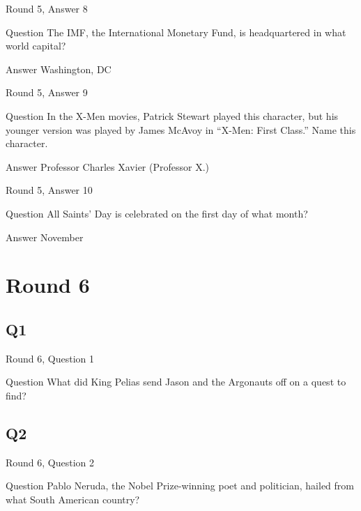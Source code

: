 \documentclass[11pt]{beamer}
\begin{document}
\begin{frame}[t]{Round 5, Answer 8}
\vspace{2em}
\begin{block}{Question}
The IMF, the International Monetary Fund, is headquartered in what world capital\@?
\end{block}
\pause{}
\begin{block}{Answer}
Washington, DC
\end{block}
\end{frame}
    

\begin{frame}[t]{Round 5, Answer 9}
\vspace{2em}
\begin{block}{Question}
In the X-Men movies, Patrick Stewart played this character, but his younger version was played by James McAvoy in ``X-Men: First Class.'' Name this character.
\end{block}
\pause{}
\begin{block}{Answer}
Professor Charles Xavier (Professor X.)
\end{block}
\end{frame}
    

\begin{frame}[t]{Round 5, Answer 10}
\vspace{2em}
\begin{block}{Question}
All Saints' Day is celebrated on the first day of what month\@?
\end{block}
\pause{}
\begin{block}{Answer}
November
\end{block}
\end{frame}
    

\section{Round 6}
    

\subsection*{Q1}
\begin{frame}[t]{Round 6, Question 1}
\vspace{2em}
\begin{block}{Question}
What did King Pelias send Jason and the Argonauts off on a quest to find\@?
\end{block}
\end{frame}
    

\subsection*{Q2}
\begin{frame}[t]{Round 6, Question 2}
\vspace{2em}
\begin{block}{Question}
Pablo Neruda, the Nobel Prize-winning poet and politician, hailed from what South American country\@?
\end{block}
\end{frame}
    
\end{document}
